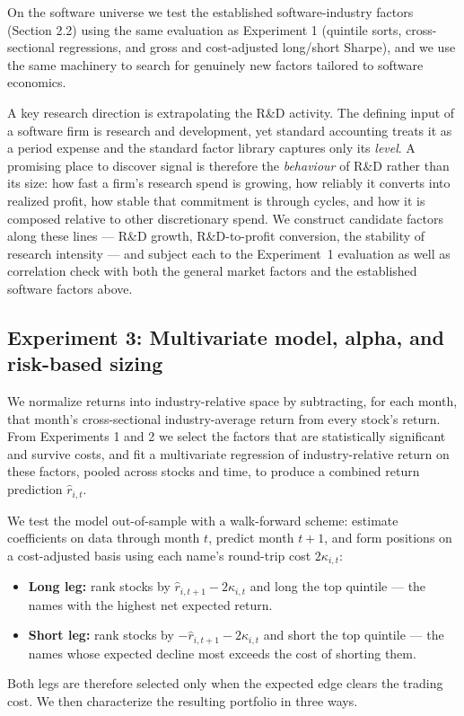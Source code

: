 \documentclass[11pt]{article}
\begin{document}
On the software universe we test the established software-industry factors (Section 2.2)
using the same evaluation as Experiment 1 (quintile sorts, cross-sectional regressions, and
gross and cost-adjusted long/short Sharpe), and we use the same machinery to search for
genuinely new factors tailored to software economics.

A key research direction is extrapolating the R\&D activity. The defining input of a
software firm is research and development, yet standard accounting treats it as a period
expense and the standard factor library captures only its \emph{level}. A promising place to 
discover signal is therefore the \emph{behaviour} of R\&D rather
than its size: how fast a firm's research spend is growing, how reliably it converts into
realized profit, how stable that commitment is through cycles, and how it is composed
relative to other discretionary spend. We construct candidate factors along these lines ---
R\&D growth, R\&D-to-profit conversion, the stability of research intensity --- and subject each to the 
Experiment~1 evaluation as well as correlation check with both the general market factors and the
established software factors above.

\subsection{Experiment 3: Multivariate model, alpha, and risk-based sizing}

We normalize returns into industry-relative space by subtracting, for each month, that
month's cross-sectional industry-average return from every stock's return. From Experiments
1 and 2 we select the factors that are statistically significant and survive costs, and fit
a multivariate regression of industry-relative return on these factors, pooled across
stocks and time, to produce a combined return prediction $\hat{r}_{i,t}$.

We test the model out-of-sample with a walk-forward scheme: estimate coefficients on data
through month $t$, predict month $t+1$, and form positions on a cost-adjusted basis using
each name's round-trip cost $2\kappa_{i,t}$:
\begin{itemize}
  \item \textbf{Long leg:} rank stocks by $\hat{r}_{i,t+1} - 2\kappa_{i,t}$ and long the top
  quintile --- the names with the highest net expected return.
  \item \textbf{Short leg:} rank stocks by $-\hat{r}_{i,t+1} - 2\kappa_{i,t}$ and short the
  top quintile --- the names whose expected decline most exceeds the cost of shorting them.
\end{itemize}
Both legs are therefore selected only when the expected edge clears the trading cost. We
then characterize the resulting portfolio in three ways.
\end{document}
